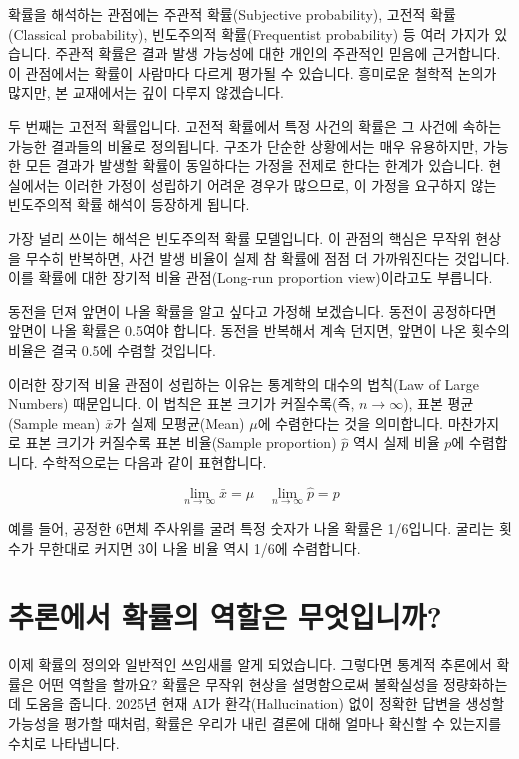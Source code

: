 \documentclass[
]{scrbook}
\begin{document}
확률을 해석하는 관점에는 주관적 확률(Subjective probability), 고전적
확률(Classical probability), 빈도주의적 확률(Frequentist probability) 등
여러 가지가 있습니다. 주관적 확률은 결과 발생 가능성에 대한 개인의
주관적인 믿음에 근거합니다. 이 관점에서는 확률이 사람마다 다르게 평가될
수 있습니다. 흥미로운 철학적 논의가 많지만, 본 교재에서는 깊이 다루지
않겠습니다.

두 번째는 고전적 확률입니다. 고전적 확률에서 특정 사건의 확률은 그
사건에 속하는 가능한 결과들의 비율로 정의됩니다. 구조가 단순한
상황에서는 매우 유용하지만, 가능한 모든 결과가 발생할 확률이 동일하다는
가정을 전제로 한다는 한계가 있습니다. 현실에서는 이러한 가정이 성립하기
어려운 경우가 많으므로, 이 가정을 요구하지 않는 빈도주의적 확률 해석이
등장하게 됩니다.

가장 널리 쓰이는 해석은 빈도주의적 확률 모델입니다. 이 관점의 핵심은
무작위 현상을 무수히 반복하면, 사건 발생 비율이 실제 참 확률에 점점 더
가까워진다는 것입니다. 이를 확률에 대한 장기적 비율 관점(Long-run
proportion view)이라고도 부릅니다.

동전을 던져 앞면이 나올 확률을 알고 싶다고 가정해 보겠습니다. 동전이
공정하다면 앞면이 나올 확률은 0.5여야 합니다. 동전을 반복해서 계속
던지면, 앞면이 나온 횟수의 비율은 결국 0.5에 수렴할 것입니다.

이러한 장기적 비율 관점이 성립하는 이유는 통계학의 대수의 법칙(Law of
Large Numbers) 때문입니다. 이 법칙은 표본 크기가 커질수록(즉,
\(n \to \infty\)), 표본 평균(Sample mean) \(\bar{x}\)가 실제
모평균(Mean) \(\mu\)에 수렴한다는 것을 의미합니다. 마찬가지로 표본
크기가 커질수록 표본 비율(Sample proportion) \(\hat{p}\) 역시 실제 비율
\(p\)에 수렴합니다. 수학적으로는 다음과 같이 표현합니다.

\[
\lim_{n\to\infty} \bar{x} = \mu \quad \lim_{n\to\infty} \hat{p} = p
\]

예를 들어, 공정한 6면체 주사위를 굴려 특정 숫자가 나올 확률은 1/6입니다.
굴리는 횟수가 무한대로 커지면 3이 나올 비율 역시 1/6에 수렴합니다.

\section{추론에서 확률의 역할은
무엇입니까?}\label{uxcd94uxb860uxc5d0uxc11c-uxd655uxb960uxc758-uxc5eduxd560uxc740-uxbb34uxc5c7uxc785uxb2c8uxae4c}

이제 확률의 정의와 일반적인 쓰임새를 알게 되었습니다. 그렇다면 통계적
추론에서 확률은 어떤 역할을 할까요? 확률은 무작위 현상을 설명함으로써
불확실성을 정량화하는 데 도움을 줍니다. 2025년 현재 AI가
환각(Hallucination) 없이 정확한 답변을 생성할 가능성을 평가할 때처럼,
확률은 우리가 내린 결론에 대해 얼마나 확신할 수 있는지를 수치로
나타냅니다.
\end{document}
